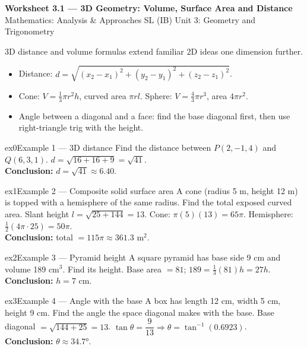 \documentclass[11pt]{article}
\begin{document}
\begin{center}
{\LARGE\bfseries\color{titleblue}Worksheet 3.1 --- 3D Geometry: Volume, Surface Area and Distance}\\[2pt]
{\small Mathematics: Analysis \& Approaches SL (IB) \textperiodcentered{} Unit 3: Geometry and Trigonometry}
\end{center}

\begin{ideabox}
3D distance and volume formulas extend familiar 2D ideas one dimension further.
\begin{itemize}[leftmargin=*,itemsep=2pt]
  \item Distance: $d=\sqrt{(x_2-x_1)^2+(y_2-y_1)^2+(z_2-z_1)^2}$.
  \item Cone: $V=\tfrac13\pi r^2h$, curved area $\pi rl$. Sphere: $V=\tfrac43\pi r^3$, area $4\pi r^2$.
  \item Angle between a diagonal and a face: find the base diagonal first, then use right-triangle trig with the height.
\end{itemize}
\end{ideabox}


\begin{example}{ex0}{Example 1 --- 3D distance}
Find the distance between $P(2,-1,4)$ and $Q(6,3,1)$.\soln
$d=\sqrt{16+16+9}=\sqrt{41}$.\\[3pt]\textbf{Conclusion:} $d=\sqrt{41}\approx6.40$.
\end{example}

\begin{example}{ex1}{Example 2 --- Composite solid surface area}
A cone (radius 5 m, height 12 m) is topped with a hemisphere of the same radius. Find the total exposed curved area.\soln
Slant height $l=\sqrt{25+144}=13$. Cone: $\pi(5)(13)=65\pi$. Hemisphere: $\tfrac12(4\pi\cdot25)=50\pi$.\\[3pt]\textbf{Conclusion:} total $=115\pi\approx361.3\text{ m}^2$.
\end{example}

\begin{example}{ex2}{Example 3 --- Pyramid height}
A square pyramid has base side 9 cm and volume 189 cm$^3$. Find its height.\soln
Base area $=81$; $189=\tfrac13(81)h=27h$.\\[3pt]\textbf{Conclusion:} $h=7$ cm.
\end{example}

\begin{example}{ex3}{Example 4 --- Angle with the base}
A box has length 12 cm, width 5 cm, height 9 cm. Find the angle the space diagonal makes with the base.\soln
Base diagonal $=\sqrt{144+25}=13$. $\tan\theta=\dfrac{9}{13}\Rightarrow\theta=\tan^{-1}(0.6923)$.\\[3pt]\textbf{Conclusion:} $\theta\approx34.7°$.
\end{example}
\end{document}
